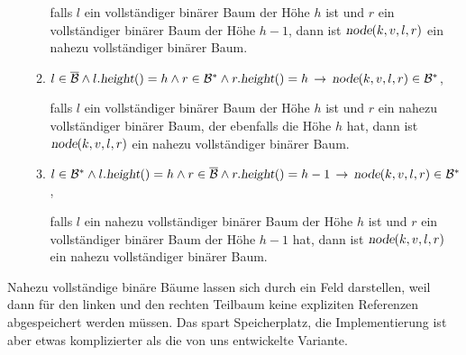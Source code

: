 \begin{enumerate}
\begin{enumerate}
            falls $l$ ein vollst\"andiger bin\"arer Baum der H\"ohe $h$ ist und $r$ ein 
            vollst\"andiger bin\"arer Baum der H\"ohe $h-1$, dann ist
            $\textsl{node}(k,v,l,r)$ ein nahezu vollst\"andiger bin\"arer Baum.
      \item $l \in \overline{\mathcal{B}} \wedge l.\textsl{height}() = h \wedge r \in \mathcal{B}^*
             \wedge r.\textsl{height}() = h \,\rightarrow\,
             \textsl{node}(k,v,l,r) \in \mathcal{B}^*$,

            falls $l$ ein vollst\"andiger bin\"arer Baum der H\"ohe $h$ ist und $r$ ein nahezu
            vollst\"andiger bin\"arer Baum, der ebenfalls die H\"ohe $h$ hat, dann ist
            $\textsl{node}(k,v,l,r)$ ein nahezu vollst\"andiger bin\"arer Baum.

      \item $l \in \mathcal{B}^* \wedge l.\textsl{height}() = h \wedge r \in \overline{\mathcal{B}}
             \wedge r.\textsl{height}() = h-1 \,\rightarrow\,
             \textsl{node}(k,v,l,r) \in \mathcal{B}^*$,

            falls $l$ ein nahezu vollst\"andiger bin\"arer Baum der H\"ohe $h$ ist und $r$ ein 
            vollst\"andiger bin\"arer Baum der H\"ohe $h-1$ hat, dann ist
            $\textsl{node}(k,v,l,r)$ ein nahezu vollst\"andiger bin\"arer Baum.
      \end{enumerate}
\end{enumerate}
Nahezu vollst\"andige bin\"are B\"aume lassen sich durch ein Feld darstellen, weil dann f\"ur
den linken und den rechten Teilbaum keine expliziten Referenzen abgespeichert werden
m\"ussen.  Das spart Speicherplatz, die Implementierung ist aber etwas komplizierter als die
von uns entwickelte Variante.

